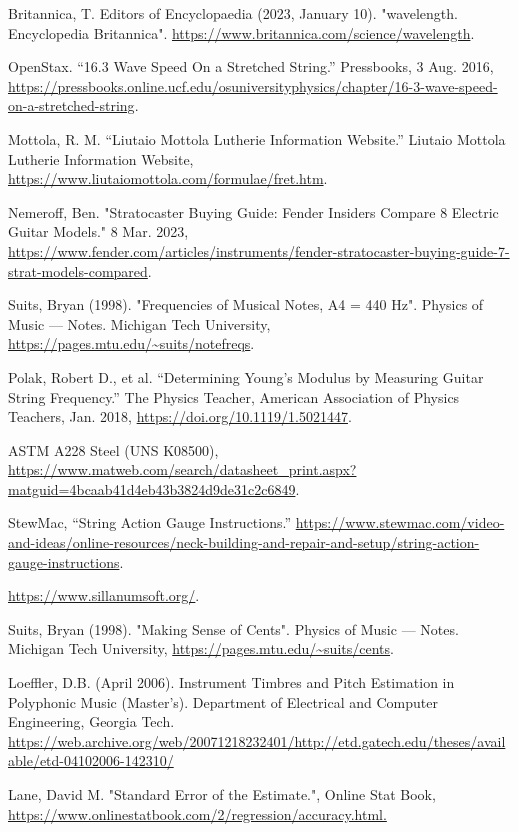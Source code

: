 \begin{thebibliography}{15}
    \scriptsize
     Britannica, T. Editors of Encyclopaedia (2023, January 10). "wavelength. Encyclopedia Britannica". \url{https://www.britannica.com/science/wavelength}.
    
     OpenStax. “16.3 Wave Speed On a Stretched String.” Pressbooks, 3 Aug. 2016, \url{https://pressbooks.online.ucf.edu/osuniversityphysics/chapter/16-3-wave-speed-on-a-stretched-string}.

     Mottola, R. M. “Liutaio Mottola Lutherie Information Website.” Liutaio Mottola Lutherie Information Website, \url{https://www.liutaiomottola.com/formulae/fret.htm}.

     Nemeroff, Ben. "Stratocaster Buying Guide: Fender Insiders Compare 8 Electric Guitar Models." 8 Mar. 2023, \url{https://www.fender.com/articles/instruments/fender-stratocaster-buying-guide-7-strat-models-compared}.

     Suits, Bryan (1998). "Frequencies of Musical Notes, A4 = 440 Hz". Physics of Music — Notes. Michigan Tech University, \url{https://pages.mtu.edu/~suits/notefreqs}.
    
     Polak, Robert D., et al. “Determining Young’s Modulus by Measuring Guitar String Frequency.” The Physics Teacher, American Association of Physics Teachers, Jan. 2018, \url{https://doi.org/10.1119/1.5021447}.

     ASTM A228 Steel (UNS K08500), \url{https://www.matweb.com/search/datasheet_print.aspx?matguid=4bcaab41d4eb43b3824d9de31c2c6849}.

     StewMac, “String Action Gauge Instructions.” \url{https://www.stewmac.com/video-and-ideas/online-resources/neck-building-and-repair-and-setup/string-action-gauge-instructions}.

     \url{https://www.sillanumsoft.org/}.

     Suits, Bryan (1998). "Making Sense of Cents". Physics of Music — Notes. Michigan Tech University, \url{https://pages.mtu.edu/~suits/cents}.

     Loeffler, D.B. (April 2006). Instrument Timbres and Pitch Estimation in Polyphonic Music (Master's). Department of Electrical and Computer Engineering, Georgia Tech. \url{https://web.archive.org/web/20071218232401/http://etd.gatech.edu/theses/available/etd-04102006-142310/}

     Lane, David M. "Standard Error of the Estimate.", Online Stat Book, \url{https://www.onlinestatbook.com/2/regression/accuracy.html.}

\end{thebibliography}